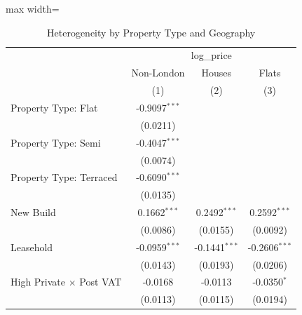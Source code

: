 
\begin{table}[htbp]
   \caption{\label{tab:heterogeneity} Heterogeneity by Property Type and Geography}
   \bigskip
   \centering
   \begin{adjustbox}{max width=\textwidth}
   \begin{tabular}{lccc}
      \toprule
       & \multicolumn{3}{c}{log\_price}\\
                                                                         & Non-London      & Houses          & Flats \\
                                                                         & (1)             & (2)             & (3)\\  
      \midrule 
      Property Type: Flat                                                 & -0.9097$^{***}$ &                 &   \\
                                                                         & (0.0211)        &                 &   \\
      Property Type: Semi                                                & -0.4047$^{***}$ &                 &   \\
                                                                         & (0.0074)        &                 &   \\
      Property Type: Terraced                                            & -0.6090$^{***}$ &                 &   \\
                                                                         & (0.0135)        &                 &   \\
      New Build                                                          & 0.1662$^{***}$  & 0.2492$^{***}$  & 0.2592$^{***}$\\
                                                                         & (0.0086)        & (0.0155)        & (0.0092)\\
      Leasehold                                                          & -0.0959$^{***}$ & -0.1441$^{***}$ & -0.2606$^{***}$\\
                                                                         & (0.0143)        & (0.0193)        & (0.0206)\\   
      High Private $\times$ Post VAT                                      & -0.0168         & -0.0113         & -0.0350$^{*}$\\
                                                                         & (0.0113)        & (0.0115)        & (0.0194)\\

\end{tabular}
\end{adjustbox}
\end{table}
